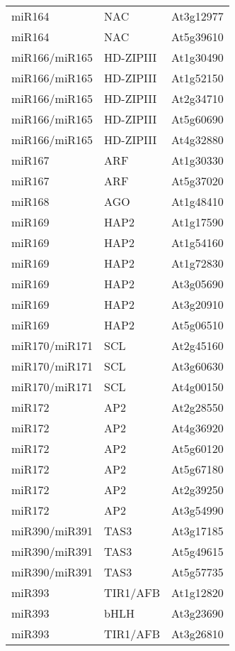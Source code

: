 \begin{table}[htbp!]
\begin{tabular}{lll}
miR164        & NAC          & At3g12977 \\
miR164        & NAC          & At5g39610 \\
miR166/miR165 & HD-ZIPIII    & At1g30490 \\
miR166/miR165 & HD-ZIPIII    & At1g52150 \\
miR166/miR165 & HD-ZIPIII    & At2g34710 \\
miR166/miR165 & HD-ZIPIII    & At5g60690 \\
miR166/miR165 & HD-ZIPIII    & At4g32880 \\
miR167        & ARF          & At1g30330 \\
miR167        & ARF          & At5g37020 \\
miR168        & AGO          & At1g48410 \\
miR169        & HAP2         & At1g17590 \\
miR169        & HAP2         & At1g54160 \\
miR169        & HAP2         & At1g72830 \\
miR169        & HAP2         & At3g05690 \\
miR169        & HAP2         & At3g20910 \\
miR169        & HAP2         & At5g06510 \\
miR170/miR171 & SCL          & At2g45160 \\
miR170/miR171 & SCL          & At3g60630 \\
miR170/miR171 & SCL          & At4g00150 \\
miR172        & AP2          & At2g28550 \\
miR172        & AP2          & At4g36920 \\
miR172        & AP2          & At5g60120 \\
miR172        & AP2          & At5g67180 \\
miR172        & AP2          & At2g39250 \\
miR172        & AP2          & At3g54990 \\
miR390/miR391 & TAS3         & At3g17185 \\
miR390/miR391 & TAS3         & At5g49615 \\
miR390/miR391 & TAS3         & At5g57735 \\
miR393        & TIR1/AFB     & At1g12820 \\
miR393        & bHLH         & At3g23690 \\
miR393        & TIR1/AFB     & At3g26810 \\

\end{tabular}
\end{table}
